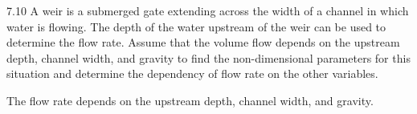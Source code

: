 
\begin{problem}{7.10}
  A weir is a submerged gate extending across the width of a channel in which water is flowing.
  The depth of the water upstream of the weir can be used to determine the flow rate.
  Assume that the volume flow depends on the upstream depth, channel width, and gravity to find the non-dimensional parameters for this situation and determine the dependency of flow rate on the other variables.
\end{problem}

\begin{assumptions}
  \item The flow rate depends on the upstream depth, channel width, and gravity.
\end{assumptions}

